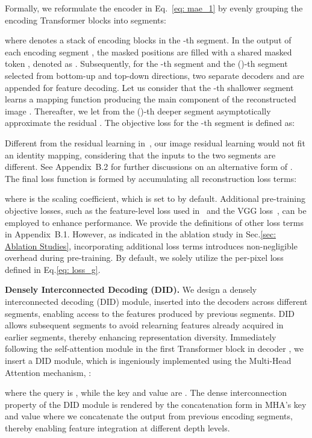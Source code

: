 \documentclass{article}
\begin{document}
Formally, we reformulate the encoder in Eq.~\eqref{eq: mae_1} by evenly grouping the encoding Transformer blocks into  segments:

where  denotes a stack of encoding blocks in the -th segment. In the output of each encoding segment , the masked positions are filled with a shared masked token , denoted as .
Subsequently, for the -th segment and the ()-th segment selected from bottom-up and top-down directions, two separate decoders  and  are appended for feature decoding. Let us consider that the -th shallower segment learns a mapping function  producing the main component of the reconstructed image . Thereafter, we let  from the ()-th deeper segment asymptotically approximate the residual . The objective loss  for the -th segment is defined as:

Different from the residual learning in~\cite{he2016deep}, our image residual learning would not fit an identity mapping, considering that the inputs to the two segments are different. See Appendix~B.2 for further discussions on an alternative form of .
The final loss function is formed by accumulating all  reconstruction loss terms: 

where  is the scaling coefficient, which is set to  by default.
Additional pre-training objective losses, such as the feature-level loss used in~\cite{chen2022sdae,wei2022FD} and the VGG loss~\cite{johnson2016perceptual}, can be employed to enhance performance. We provide the definitions of other loss terms in Appendix~B.1.
However, as indicated in the ablation study in Sec.\ref{sec: Ablation Studies}, incorporating additional loss terms introduces non-negligible overhead during pre-training. By default, we solely utilize the per-pixel loss defined in Eq.\eqref{eq: loss_g}.




\textbf{Densely Interconnected Decoding (DID).}
We design a densely interconnected decoding (DID) module, inserted into the decoders across different segments, enabling access to the features produced by previous segments. DID allows subsequent segments to avoid relearning features already acquired in earlier segments, thereby enhancing representation diversity. Immediately following the self-attention module in the first Transformer block in decoder , we insert a DID module, which is ingeniously implemented using the Multi-Head Attention mechanism, :

where the query  is , while the key and value  are . The dense interconnection property of the DID module is rendered by the concatenation form in MHA's key   and value  where we concatenate the output from previous encoding segments, thereby enabling feature integration at different depth levels.
\end{document}
